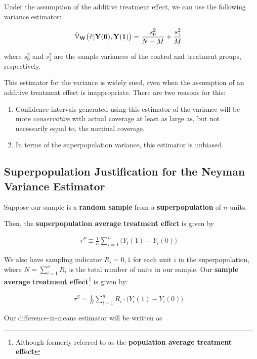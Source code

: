 Under the assumption of the additive treatment effect, we can use the following variance estimator:

\begin{align}
    \hat{{\mathbb{V}}}_\mathbf{W}\bigl(\hat\tau | \mathbf{Y(0),Y(1)}\bigr) = \frac{s_0^2}{N-M} + \frac{s_1^2}{M}
\end{align}

where $s_0^2$ and $s_1^2$ are the sample variances of the control and treatment groups, respectively.

This estimator for the variance is widely sued, even when the assumption of an additive treatment effect is inappropriate. 
There are two reasons for this:

\begin{enumerate}
    \item Confidence intervals generated using this estimator of the variance will be more \textit{conservative} with actual coverage at least as large as, but not necessarily equal to, the nominal coverage.
    \item In terms of the superpopulation variance, this estimator is unbiased.
\end{enumerate}

\subsection{Superpopulation Justification for the Neyman Variance Estimator}

Suppose our sample is a \textbf{random sample} from a \textbf{superpopulation} of $n$ units.

Then, the \textbf{superpopulation average treatment effect} is given by 

\begin{align}
    \tau^P \equiv \frac{1}{n}\sum_{i=1}^n \bigl(Y_i(1) - Y_i(0)\bigr)
\end{align}

We also have sampling indicator $R_i=0,1$ for each unit $i$ in the superpopulation, where $N = \sum_{i=1}^n R_i$ is the total number of units in our sample.
Our \textbf{sample average treatment effect}\footnote{Although formerly referred to as the \textbf{population average treatment effect}} is given by:

\begin{align}
    \tau^S = \frac{1}{N}\sum_{i=1}^n R_i\cdot\bigl(Y_i(1) - Y_i(0)\bigr)
\end{align}

Our difference-in-means estimator will be written as

